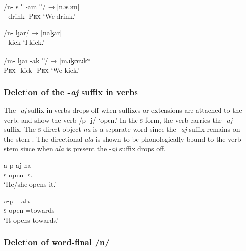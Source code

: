 \ea \label{ex:2:77}
\gll /n- {s \textsuperscript{e}} {-am \textsuperscript{o}/} \hspace{1.5pt} →  [nɔsɔm]\\
     - drink -\textsc{Pex} {} {} {‘We drink.’}\\
\z

\ea \label{ex:2:78}
\gll /n- ɮar/ \hspace{37pt}  →  [naɮar] \\
{\oneS}- kick {} {} {‘I kick.’}\\
\z

\ea \label{ex:2:79}
\gll /m-                            ɮar    {-ak \textsuperscript{o}/}   →  [mɔɮʊrɔkʷ]\\
     \textsc{Pex}-  kick   -\textsc{Pex}  {} {‘We kick.’}\\
\z

\subsubsection{Deletion of the -\textit{aj} suffix in verbs}\label{sec:2.6.1.4}
The -\textit{aj} suffix in verbs drops off when suffixes or extensions are attached to the verb.   and  show the verb /p -j/ ‘open.’ In the \textsc{s} form, the verb carries the \textit{{}-aj} suffix. The \textsc{s} direct object\textit{ na }is a separate word since the \textit{{}-aj} suffix remains on the stem . The directional \textit{ala} is shown to be phonologically bound to the verb stem since when \textit{ala} is present  the \textit{{}-aj} suffix drops off.

\ea \label{ex:2:80}
\gll   a-p-aj                                na\\
      \textsc{s}-open-{\CL}  \textsc{s}.{\DO}\\
\glt  ‘He/she opens it.’
\z

\ea \label{ex:2:81}
\gll  a-p                                   =ala\\
      \textsc{s}-open  =towards\\
\glt  ‘It opens towards.’
\z

\subsubsection{Deletion of word-final /n/}\label{sec:2.6.1.5}

